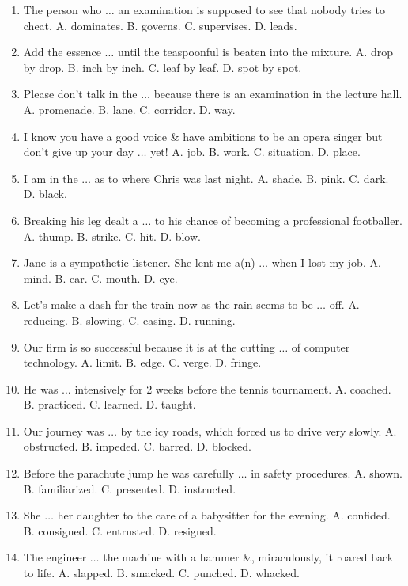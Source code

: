 \documentclass{article}
\numberwithin{equation}{section}
\begin{document}
\begin{enumerate}[leftmargin=8mm]
	\item The person who $\ldots$ an examination is supposed to see that nobody tries to cheat. {\sf A.} dominates. {\sf B.} governs. {\sf C.} supervises. {\sf D.} leads.
	\item Add the essence $\ldots$ until the teaspoonful is beaten into the mixture. {\sf A.} drop by drop. {\sf B.} inch by inch. {\sf C.} leaf by leaf. {\sf D.} spot by spot.
	\item Please don't talk in the $\ldots$ because there is an examination in the lecture hall. {\sf A.} promenade. {\sf B.} lane. {\sf C.} corridor. {\sf D.} way.
	\item I know you have a good voice \& have ambitions to be an opera singer but don't give up your day $\ldots$ yet! {\sf A.} job. {\sf B.} work. {\sf C.} situation. {\sf D.} place.
	\item I am in the $\ldots$ as to where Chris was last night. {\sf A.} shade. {\sf B.} pink. {\sf C.} dark. {\sf D.} black.
	\item Breaking his leg dealt a $\ldots$ to his chance of becoming a professional footballer. {\sf A.} thump. {\sf B.} strike. {\sf C.} hit. {\sf D.} blow.
	\item Jane is a sympathetic listener. She lent me a(n) $\ldots$ when I lost my job. {\sf A.} mind. {\sf B.} ear. {\sf C.} mouth. {\sf D.} eye.
	\item Let's make a dash for the train now as the rain seems to be $\ldots$ off. {\sf A.} reducing. {\sf B.} slowing. {\sf C.} easing. {\sf D.} running.
	\item Our firm is so successful because it is at the cutting $\ldots$ of computer technology. {\sf A.} limit. {\sf B.} edge. {\sf C.} verge. {\sf D.} fringe.
	\item He was $\ldots$ intensively for 2 weeks before the tennis tournament. {\sf A.} coached. {\sf B.} practiced. {\sf C.} learned. {\sf D.} taught.
	\item Our journey was $\ldots$ by the icy roads, which forced us to drive very slowly. {\sf A.} obstructed. {\sf B.} impeded. {\sf C.} barred. {\sf D.} blocked.
	\item Before the parachute jump he was carefully $\ldots$ in safety procedures. {\sf A.} shown. {\sf B.} familiarized. {\sf C.} presented. {\sf D.} instructed.
	\item She $\ldots$ her daughter to the care of a babysitter for the evening. {\sf A.} confided. {\sf B.} consigned. {\sf C.} entrusted. {\sf D.} resigned.
	\item The engineer $\ldots$ the machine with a hammer \&, miraculously, it roared back to life. {\sf A.} slapped. {\sf B.} smacked. {\sf C.} punched. {\sf D.} whacked.

\end{enumerate}
\end{document}
